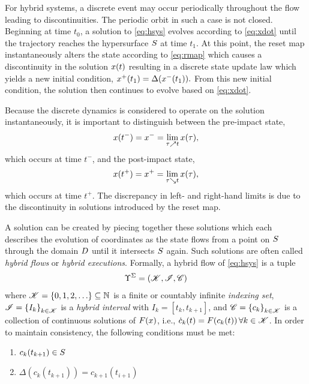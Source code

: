 For hybrid systems, a discrete event may occur periodically throughout the flow
leading to discontinuities.
%
The periodic orbit in such a case is not closed.
%
Beginning at time $t_{0}$, a solution to \eqref{eq:hsys} evolves according to
\eqref{eq:xdot} until the trajectory reaches the hypersurface $S$ at time
$t_{1}$.
%
At this point, the reset map instantaneously alters the state according to
\eqref{eq:rmap} which causes a discontinuity in the solution $x(t)$ resulting
in a discrete state update law which yields a new initial condition, $x^{+}(t_{1})
= \Delta(x^{-}(t_{1})).$
%
From this new initial condition, the solution then continues to evolve based on
\eqref{eq:xdot}.

Because the discrete dynamics is considered to operate on the solution
instantaneously, it is important to distinguish between the pre-impact state,
\begin{align*}
  x(t^{-}) = x^{-} = \lim_{\tau \nearrow t} x(\tau),
\end{align*}
which occurs at time $t^{-}$, and the post-impact state,
\begin{align*}
  x(t^{+}) = x^{+} = \lim_{\tau \searrow t} x(\tau),
\end{align*}
which occurs at time $t^{+}$.
%
The discrepancy in left- and right-hand limits is due to the discontinuity in
solutions introduced by the reset map.
%

A solution can be created by piecing together these solutions which each
describes the evolution of coordinates as the state flows from a point on
$S$ through the domain $D$ until it intersects $S$ again.
%
Such solutions are often called {\em hybrid flows} or {\em hybrid executions}.
%
Formally, a hybrid flow of \eqref{eq:hsys} is a tuple
\begin{align*}
  \Upsilon^{\Sigma} = \left( \mathscr{K}, \mathscr{I}, \mathscr{C} \right)
\end{align*}
where $\mathscr{K} = \{0, 1, 2, \ldots\} \subseteq \mathbb{N}$ is a finite or countably
infinite {\em indexing set}, $\mathscr{I} = \left\{I_{k}\right\}_{k \in \mathscr{K}}$ is a {\em
  hybrid interval} with $I_{k} = \left[t_{k}, t_{k+1}\right]$, and $\mathscr{C} =
\left\{c_{k}\right\}_{k \in \mathscr{K}}$ is a collection of continuous solutions of
$F(x)$, i.e., ${\dot c}_{k}(t) = F(c_{k}(t)) \, \forall k \in \mathscr{K}$.
%
In order to maintain consistency, the following conditions must be met:
%
\begin{enumerate}
\item $c_{k}(t_{k+1}) \in S$
\item $\Delta(c_{k}(t_{k+1})) = c_{k+1}(t_{i+1})$
\end{enumerate}

